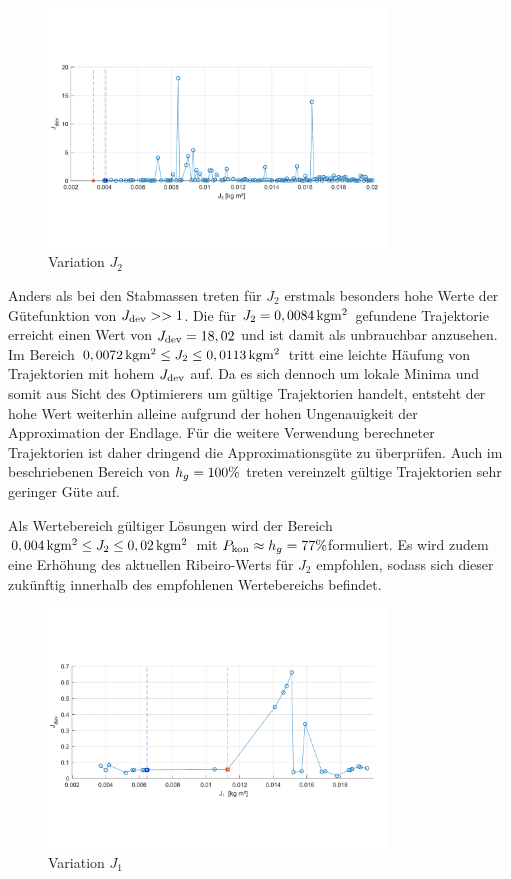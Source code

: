 \begin{figure}
	\centering
		\includegraphics[width=0.8\textwidth]{Bilder/Trajektorien/J2.pdf}
	\caption{Variation $J_2$}
	\label{fig:trjvarJ2}
\end{figure}

Anders als bei den Stabmassen treten für $J_2$ erstmals besonders hohe Werte der Gütefunktion von $J_{\mathrm{dev}}>>1$. Die für $J_2=0,0084\,\mathrm{kg m^2}$ gefundene Trajektorie erreicht einen Wert von $J_{\mathrm{dev}}=18,02$ und ist damit als unbrauchbar anzusehen. Im Bereich $0,0072\,\mathrm{kg m^2}\leq J_2 \leq 0,0113\,\mathrm{kg m^2}$ tritt eine leichte Häufung von Trajektorien mit hohem $J_{\mathrm{dev}}$ auf. Da es sich dennoch um lokale Minima und somit aus Sicht des Optimierers um gültige Trajektorien handelt, entsteht der hohe Wert weiterhin alleine aufgrund der hohen Ungenauigkeit der Approximation der Endlage. Für die weitere Verwendung berechneter Trajektorien ist daher dringend die Approximationsgüte zu überprüfen. Auch im beschriebenen Bereich von $h_g=100 \%$ treten vereinzelt gültige Trajektorien sehr geringer Güte auf.

Als Wertebereich gültiger Lösungen wird der Bereich $0,004\,\mathrm{kg m^2}\leq J_2 \leq 0,02\,\mathrm{kg m^2}$ mit $P_{\mathrm{kon}}\approx h_g=77 \%$formuliert. Es wird zudem eine Erhöhung des aktuellen Ribeiro-Werts für $J_2$ empfohlen, sodass sich dieser zukünftig innerhalb des empfohlenen Wertebereichs befindet.

\begin{figure}
	\centering
		\includegraphics[width=0.8\textwidth]{Bilder/Trajektorien/J1.pdf}
	\caption{Variation $J_1$}
	\label{fig:trjvarJ1}
\end{figure}

